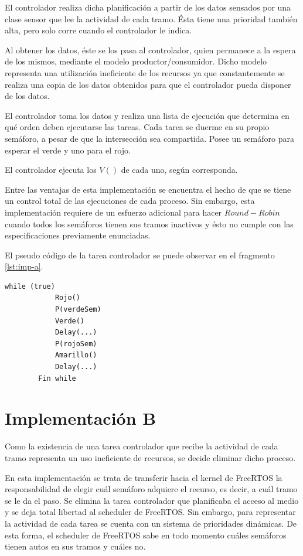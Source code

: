 	El controlador realiza dicha planificación a partir de los datos sensados por una clase sensor que lee la actividad de cada tramo.
	Ésta tiene una prioridad también alta, pero solo corre cuando el controlador le indica.

	Al obtener los datos, éste se los pasa al controlador, quien permanece a la espera de los mismos, mediante el modelo productor/consumidor.
	Dicho modelo representa una utilización ineficiente de los recursos ya que constantemente se realiza una copia de los datos obtenidos para que el controlador pueda disponer de los datos.

	El controlador toma los datos y realiza una lista de ejecución que determina en qué orden deben ejecutarse las tareas.
	Cada tarea se duerme en su propio semáforo, a pesar de que la intersección sea compartida.
	Posee un semáforo para esperar el verde y uno para el rojo.

	El controlador ejecuta los $V()$ de cada uno, según corresponda.

	Entre las ventajas de esta implementación se encuentra el hecho de que se tiene un control total de las ejecuciones de cada proceso.
	Sin embargo, esta implementación requiere de un esfuerzo adicional para hacer $Round-Robin$ cuando todos los semáforos tienen sus tramos inactivos y ésto no cumple con las especificaciones previamente enunciadas.

	El pseudo código de la tarea controlador se puede observar en el fragmento \ref{lst:imp-a}.

	\begin{lstlisting}[label=lst:imp-a, caption=Pseudocódigo de la tarea controlador.]
		while (true)
			Rojo()
			P(verdeSem)
			Verde()
			Delay(...)
			P(rojoSem)
			Amarillo()
			Delay(...)
		Fin while
	\end{lstlisting}



\section{Implementación B}

	Como la existencia de una tarea controlador que recibe la actividad de cada tramo representa un uso ineficiente de recursos, se decide eliminar dicho proceso.

	En esta implementación se trata de transferir hacia el kernel de FreeRTOS la responsabilidad de elegir cuál semáforo adquiere el recurso, es decir, a cuál tramo se le da el paso.
	Se elimina la tarea controlador que planificaba el acceso al medio y se deja total libertad al scheduler de FreeRTOS.
	Sin embargo, para representar la actividad de cada tarea se cuenta con un sistema de prioridades dinámicas.
	De esta forma, el scheduler de FreeRTOS sabe en todo momento cuáles semáforos tienen autos en sus tramos y cuáles no.

